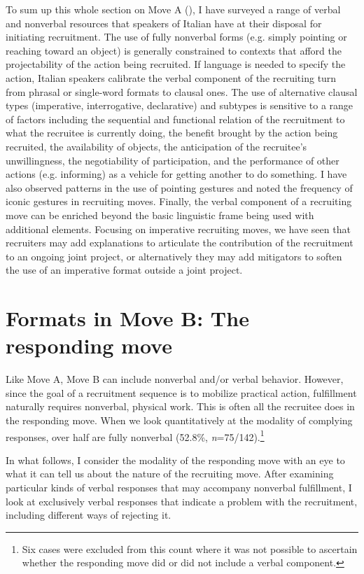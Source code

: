 \documentclass[output=paper,modfonts]{langscibook}
\begin{document}
\noindent
To sum up this whole section on Move A (), I have surveyed a range of verbal and nonverbal resources that speakers of Italian have at their disposal for initiating recruitment. The use of fully nonverbal forms (e.g. simply pointing or reaching toward an object) is generally constrained to contexts that afford the projectability of the action being recruited. If language is needed to specify the action, Italian speakers calibrate the verbal component of the recruiting turn from phrasal or single-word formats to clausal ones. The use of alternative clausal types (imperative, interrogative, declarative) and subtypes is sensitive to a range of factors including the sequential and functional relation of the recruitment to what the recruitee is currently doing, the benefit brought by the action being recruited, the availability of objects, the anticipation of the recruitee's unwillingness, the negotiability of participation, and the performance of other actions (e.g. informing) as a vehicle for getting another to do something. I have also observed patterns in the use of pointing gestures and noted the frequency of iconic gestures in recruiting moves. Finally, the verbal component of a recruiting move can be enriched beyond the basic linguistic frame being used with additional elements. Focusing on imperative recruiting moves, we have seen that recruiters may add explanations to articulate the contribution of the recruitment to an ongoing joint project, or alternatively they may add mitigators to soften the use of an imperative format outside a joint project.

\section{Formats in Move B: The responding move}\label{sec:rossi:4}
Like Move A, Move B can include nonverbal and/or verbal behavior. However, since the goal of a recruitment sequence is to mobilize practical action, fulfillment naturally requires nonverbal, physical work. This is often all the recruitee does in the responding move. When we look quantitatively at the modality of complying responses, over half are fully nonverbal (52.8\%, \textit{n}=75/142).\footnote{Six cases were excluded from this count where it was not possible to ascertain whether the responding move did or did not include a verbal component.} 

In what follows, I consider the modality of the responding move with an eye to what it can tell us about the nature of the recruiting move. After examining particular kinds of verbal responses that may accompany nonverbal fulfillment, I look at exclusively verbal responses that indicate a problem with the recruitment, including different ways of rejecting it.
\end{document}
